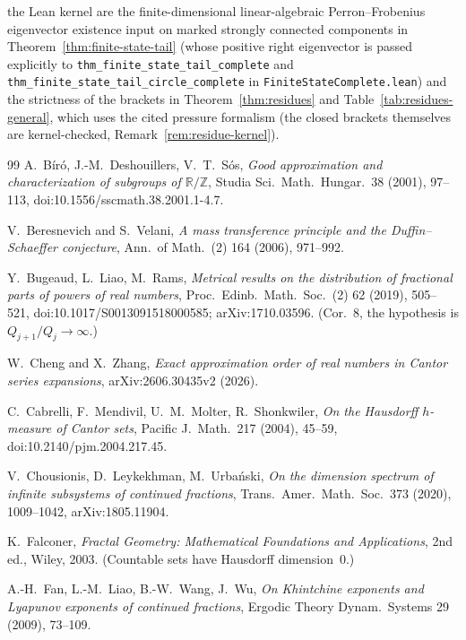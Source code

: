 \documentclass[11pt]{article}
\theoremstyle{definition}
\theoremstyle{remark}
\newcommand{\R}{\mathbb{R}}
\newcommand{\Z}{\mathbb{Z}}
\begin{document}
the Lean kernel are the finite-dimensional linear-algebraic Perron--Frobenius
eigenvector existence input on marked strongly connected components in
Theorem~\ref{thm:finite-state-tail} (whose positive right eigenvector is passed
explicitly to \texttt{thm\_\allowbreak finite\_\allowbreak state\_\allowbreak tail\_\allowbreak complete}
and \texttt{thm\_\allowbreak finite\_\allowbreak state\_\allowbreak tail\_\allowbreak circle\_\allowbreak complete}
in \texttt{FiniteStateComplete.lean}) and the strictness of the brackets in
Theorem~\ref{thm:residues} and Table~\ref{tab:residues-general}, which uses the
cited pressure formalism (the closed brackets themselves are kernel-checked,
Remark~\ref{rem:residue-kernel}).

\begin{thebibliography}{99}
 A.~B\'ir\'o, J.-M.~Deshouillers, V.~T.~S\'os, \emph{Good
approximation and characterization of subgroups of $\R/\Z$}, Studia Sci.\ Math.\ Hungar.\ 38 (2001), 97--113, doi:10.1556/\allowbreak sscmath.38.2001.1-4.7.

 V.~Beresnevich and S.~Velani, \emph{A mass transference principle
and the Duffin--Schaeffer conjecture}, Ann.\ of Math.\ (2) 164 (2006), 971--992.

 Y.~Bugeaud, L.~Liao, M.~Rams, \emph{Metrical results on the
distribution of fractional parts of powers of real numbers}, Proc.\ Edinb.\ Math.\ Soc.\ (2) 62 (2019), 505--521, doi:10.1017/\allowbreak S0013091518000585; arXiv:1710.03596. (Cor.~8, the hypothesis is $Q_{j+1}/Q_j\to\infty$.)

 W.~Cheng and X.~Zhang, \emph{Exact approximation order of real numbers in
Cantor series expansions}, arXiv:2606.30435v2 (2026).

 C.~Cabrelli, F.~Mendivil, U.~M.~Molter, R.~Shonkwiler,
\emph{On the Hausdorff $h$-measure of Cantor sets}, Pacific J.\ Math.\ 217
(2004), 45--59, doi:10.2140/\allowbreak pjm.2004.217.45.

 V.~Chousionis, D.~Leykekhman, M.~Urba\'nski, \emph{On the
dimension spectrum of infinite subsystems of continued fractions}, Trans.\ Amer.\ Math.\ Soc.\ 373 (2020), 1009--1042, arXiv:1805.11904.

 K.~Falconer, \emph{Fractal Geometry: Mathematical
Foundations and Applications}, 2nd ed., Wiley, 2003. (Countable sets have
Hausdorff dimension~$0$.)

 A.-H.~Fan, L.-M.~Liao, B.-W.~Wang, J.~Wu, \emph{On Khintchine
exponents and Lyapunov exponents of continued fractions}, Ergodic Theory Dynam.\ Systems 29 (2009), 73--109.


\end{thebibliography}
\end{document}
